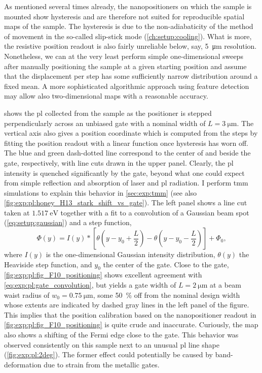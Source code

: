 As mentioned several times already, the nanopositioners on which the sample is mounted show hysteresis and are therefore not suited for reproducible spatial maps of the sample.
The hysteresis is due to the non-adiabaticity of the method of movement in the so-called slip-stick mode (\cf \cref{ch:setup:cooling}).
What is more, the resistive position readout is also fairly unreliable below, say, \qty{5}{\micro\meter} resolution.
Nonetheless, we can at the very least perform simple one-dimensional sweeps after manually positioning the sample at a given starting position and assume that the displacement per step has some sufficiently narrow distribution around a fixed mean.
A more sophisticated algorithmic approach using feature detection may allow also two-dimensional maps with a reasonable accuracy.

 shows the \gls{pl} collected from the sample as the positioner is stepped perpendicularly across an unbiased gate with a nominal width of $L = \qty{3}{\micro\meter}$.
The vertical axis also gives a position coordinate which is computed from the steps by fitting the position readout with a linear function once hysteresis has worn off.
The blue and green dash-dotted line correspond to the center of and beside the gate, respectively, with line cuts drawn in the upper panel.
Clearly, the \gls{pl} intensity is quenched significantly by the gate, beyond what one could expect from simple reflection and absorption of laser and \gls{pl} radiation.
I perform \gls{tmm} simulations to explain this behavior in \cref{sec:exp:tmm} (see also \cref{fig:exp:pl:honey_H13_stark_shift_vs_gate}).
The left panel shows a line cut taken at $\qty{1.517}{\electronvolt}$ together with a fit to a convolution of a Gaussian beam spot (\cref{eq:setup:gaussian}) and a step function,
\begin{equation}\label{eq:exp:pl:gate_convolution}
    \Phi(y) = I(y)\ast\left[\theta\left(y - y_0 + \frac{L}{2}\right) - \theta\left(y - y_0 - \frac{L}{2}\right)\right] + \Phi_0,
\end{equation}
where $I(y)$ is the one-dimensional Gaussian intensity distribution, $\theta(y)$ the Heaviside step function, and $y_0$ the center of the gate.
Close to the gate, \cref{fig:exp:pl:fig_F10_positioning} shows excellent agreement with \cref{eq:exp:pl:gate_convolution}, but yields a gate width of $L=\qty{2}{\micro\meter}$ at a beam waist radius of $w_0=\qty{0.75}{\micro\meter}$, some \qty{50}{\percent} off from the nominal design width whose extents are indicated by dashed gray lines in the left panel of the figure.
This implies that the position calibration based on the nanopositioner readout in \cref{fig:exp:pl:fig_F10_positioning} is quite crude and inaccurate.
Curiously, the map also shows a shifting of the Fermi edge close to the gate.
This behavior was observed consistently on this sample next to an unusual \gls{pl} line shape (\cf \cref{fig:exp:pl:2deg}).
The former effect could potentially be caused by band-deformation due to strain from the metallic gates.

